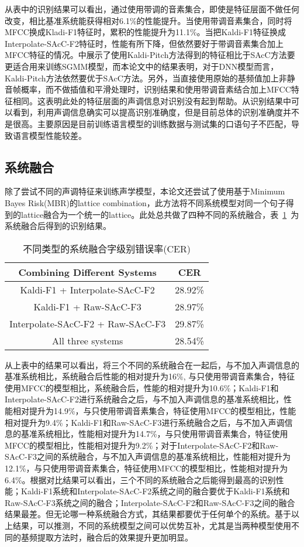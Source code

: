 从表中的识别结果可以看出，通过使用带调的音素集合，即使是特征层面不做任何改变，相比基准系统能获得相对6.1\%的性能提升。当使用带调音素集合，同时将MFCC换成Kladi-F1特征时，累积的性能提升为11.1\%。当把Kaldi-F1特征换成Interpolate-SAcC-F2特征时，性能有所下降，但依然要好于带调音素集合加上MFCC特征的情况。\cite{ghahremani2014pitch}中展示了使用Kaldi-Pitch方法得到的特征相比于SAcC方法要更适合用来训练SGMM模型，而本论文中的结果表明，对于DNN模型而言，Kaldi-Pitch方法依然要优于SAcC方法。另外，当直接使用原始的基频值加上非静音帧概率，而不做插值和平滑处理时，识别结果和使用带调音素结合加上MFCC特征相同。这表明此处的特征层面的声调信息对识别没有起到帮助。从识别结果中可以看到，利用声调信息确实可以提高识别准确度，但是目前总体的识别准确度并不是很高。主要原因是目前训练语言模型的训练数据与测试集的口语句子不匹配，导致语言模型性能较差。
\subsection{系统融合}
除了尝试不同的声调特征来训练声学模型，本论文还尝试了使用基于Minimum Bayes Risk(MBR)的lattice combination\cite{xu2011minimum}，此方法将不同系统模型对同一个句子得到的lattice融合为一个统一的lattice。此处总共做了四种不同的系统融合，表~\ref{tab:table5}~为系统融合后得到的识别结果。
\begin{table}[htbp]
\caption{不同类型的系统融合字级别错误率(CER)}\label{tab:table5}
\vspace{0.5em}\centering\wuhao
\begin{tabular}{cc}
\toprule[1.5pt]
Combining Different Systems & CER \\
\midrule[1pt]
Kaldi-F1 + Interpolate-SAcC-F2 & 28.92\% \\
Kaldi-F1 + Raw-SAcC-F3 & 28.97\% \\
Interpolate-SAcC-F2 + Raw-SAcC-F3 & 29.87\% \\
All three systems & 28.54\% \\
\bottomrule[1.5pt]
\end{tabular}
\vspace{\baselineskip}
\end{table}

从上表中的结果可以看出，将三个不同的系统融合在一起后，与不加入声调信息的基准系统相比，系统融合后性能的相对提升为16\%, 与只使用带调音素集合，特征使用MFCC的模型相比，系统融合后，性能的相对提升为10.6\%；Kaldi-F1和Interpolate-SAcC-F2进行系统融合之后，与不加入声调信息的基准系统相比，性能相对提升为14.9\%，与只使用带调音素集合，特征使用MFCC的模型相比，性能相对提升为9.4\%；Kaldi-F1和Raw-SAcC-F3进行系统融合之后，与不加入声调信息的基准系统相比，性能相对提升为14.7\%，与只使用带调音素集合，特征使用MFCC的模型相比，性能相对提升为9.2\%；对于Interpolate-SAcC-F2和Raw-SAcC-F3之间的系统融合，与不加入声调信息的基准系统相比，性能相对提升为12.1\%，与只使用带调音素集合，特征使用MFCC的模型相比，性能相对提升为6.4\%。根据对比结果可以看出，三个不同的系统融合之后能得到最高的识别性能；Kaldi-F1系统和Interpolate-SAcC-F2系统之间的融合要优于Kaldi-F1系统和Raw-SAcC-F3系统之间的融合；Interpolate-SAcC-F2和Raw-SAcC-F3之间的融合结果最差。但无论哪一种系统融合方式，其结果都要优于任何单个的系统。基于以上结果，可以推测，不同的系统模型之间可以优势互补，尤其是当两种模型使用不同的基频提取方法时，融合后的效果提升更加明显。
